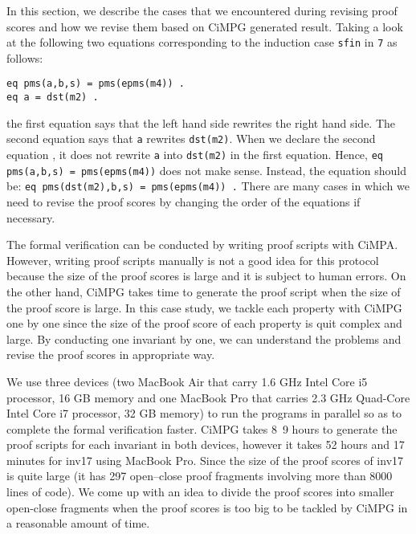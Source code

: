 \documentclass[a4paper,fleqn]{cas-dc}
\begin{document}
In this section, we describe the cases that we encountered during revising proof scores and how we revise them based on CiMPG generated result. Taking a look at the following two equations corresponding to the induction case \verb!sfin! in \verb!7! as follows:
\begin{small}
\begin{verbatim}
eq pms(a,b,s) = pms(epms(m4)) .
eq a = dst(m2) .
\end{verbatim}
\end{small}
the first equation says that the left hand side rewrites the right hand side. The second equation says that \verb!a! rewrites \verb!dst(m2)!. When we declare the second equation , it does not rewrite \verb!a! into \verb!dst(m2)! in the first equation. Hence, \verb!eq pms(a,b,s) = pms(epms(m4))! does not make sense. Instead, the equation should be: \verb!eq pms(dst(m2),b,s) = pms(epms(m4)) .! There are many cases in which we need to revise the proof scores by changing the order of the equations if necessary.

The formal verification can be conducted by writing  proof  scripts  with  CiMPA. However, writing proof scripts manually is not a good idea for this protocol because the size of the proof scores is large and it is subject to human errors. On the other hand, CiMPG takes time to generate the proof script when the size of the proof score is large. In this case study, we tackle each property with
CiMPG one by one since the size of the proof score of each property is quit complex and large. By conducting one invariant by one, we can understand the problems and revise the proof scores in appropriate way. 

We use three devices (two MacBook Air that carry 1.6 GHz Intel Core i5 processor, 16 GB memory and one MacBook Pro that carries 2.3 GHz Quad-Core Intel Core i7 processor, 32 GB memory) to run the programs in parallel so as to complete the formal verification faster. CiMPG takes 8~9 hours to generate the proof scripts for each invariant in both devices, however it takes 52 hours and 17 minutes for inv17 using MacBook Pro. Since the size of the proof scores of inv17 is quite large (it has 297 open–close proof fragments involving more than 8000 lines of code). We come up with an idea to divide the proof scores into smaller  open-close fragments when the proof scores is too big to be tackled by CiMPG in a reasonable amount of time.
\end{document}
